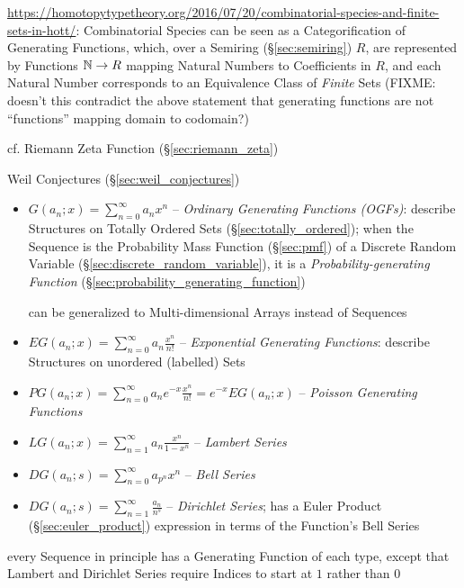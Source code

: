 \url{https://homotopytypetheory.org/2016/07/20/combinatorial-species-and-finite-sets-in-hott/}:
Combinatorial Species can be seen as a Categorification of Generating Functions,
which, over a Semiring (\S\ref{sec:semiring}) $R$, are represented by Functions
$\mathbb{N} \rightarrow R$ mapping Natural Numbers to Coefficients in $R$, and each
Natural Number corresponds to an Equivalence Class of \emph{Finite} Sets
(FIXME: doesn't this contradict the above statement that generating functions
are not ``functions'' mapping domain to codomain?)

\fist cf. Riemann Zeta Function (\S\ref{sec:riemann_zeta})

\fist Weil Conjectures (\S\ref{sec:weil_conjectures})

\begin{itemize}
  \item $G(a_n; x) = \sum_{n=0}^\infty a_n x^n$ -- \emph{Ordinary Generating
    Functions (OGFs)}: describe Structures on Totally Ordered Sets
    (\S\ref{sec:totally_ordered}); when the Sequence is the Probability Mass
    Function (\S\ref{sec:pmf}) of a Discrete Random Variable
    (\S\ref{sec:discrete_random_variable}), it is a \emph{Probability-generating
      Function} (\S\ref{sec:probability_generating_function})

    can be generalized to Multi-dimensional Arrays instead of Sequences
  \item $EG(a_n; x) = \sum_{n=0}^\infty a_n \frac{x^n}{n!}$ -- \emph{Exponential
    Generating Functions}: describe Structures on unordered (labelled) Sets
  \item $PG(a_n; x) = \sum_{n=0}^\infty a_n e^{-x}\frac{x^n}{n!} = e^{-x}EG(a_n; x)$
    -- \emph{Poisson Generating Functions}
  \item $LG(a_n; x) = \sum_{n=1}^\infty a_n \frac{x^n}{1 - x^n}$ --
    \emph{Lambert Series}
  \item $DG(a_n; s) = \sum_{n=0}^\infty a_{p^n} x^n$ -- \emph{Bell Series}
  \item $DG(a_n; s) = \sum_{n=1}^\infty \frac{a_n}{n^s}$ --
    \emph{Dirichlet Series}; has a Euler Product (\S\ref{sec:euler_product})
    expression in terms of the Function's Bell Series
\end{itemize}

every Sequence in principle has a Generating Function of each type, except that
Lambert and Dirichlet Series require Indices to start at $1$ rather than $0$



